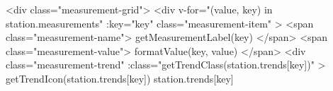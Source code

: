 <div class="measurement-grid"> <div v-for="(value, key) in station.measurements" :key="key" class="measurement-item" > <span class="measurement-name">{{ getMeasurementLabel(key) }}</span> <span class="measurement-value">{{ formatValue(key, value) }}</span> <div class="measurement-trend" :class="getTrendClass(station.trends[key])" > {{ getTrendIcon(station.trends[key]) }} {{ station.trends[key] }}%